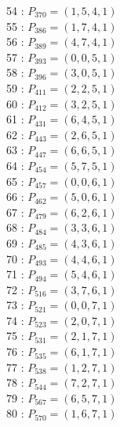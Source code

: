 \documentclass{article}
\begin{document}
{\begin{multicols}{3}
54 : $P_{370}=( 1, 5, 4, 1 )$\\
55 : $P_{386}=( 1, 7, 4, 1 )$\\
56 : $P_{389}=( 4, 7, 4, 1 )$\\
57 : $P_{393}=( 0, 0, 5, 1 )$\\
58 : $P_{396}=( 3, 0, 5, 1 )$\\
59 : $P_{411}=( 2, 2, 5, 1 )$\\
60 : $P_{412}=( 3, 2, 5, 1 )$\\
61 : $P_{431}=( 6, 4, 5, 1 )$\\
62 : $P_{443}=( 2, 6, 5, 1 )$\\
63 : $P_{447}=( 6, 6, 5, 1 )$\\
64 : $P_{454}=( 5, 7, 5, 1 )$\\
65 : $P_{457}=( 0, 0, 6, 1 )$\\
66 : $P_{462}=( 5, 0, 6, 1 )$\\
67 : $P_{479}=( 6, 2, 6, 1 )$\\
68 : $P_{484}=( 3, 3, 6, 1 )$\\
69 : $P_{485}=( 4, 3, 6, 1 )$\\
70 : $P_{493}=( 4, 4, 6, 1 )$\\
71 : $P_{494}=( 5, 4, 6, 1 )$\\
72 : $P_{516}=( 3, 7, 6, 1 )$\\
73 : $P_{521}=( 0, 0, 7, 1 )$\\
74 : $P_{523}=( 2, 0, 7, 1 )$\\
75 : $P_{531}=( 2, 1, 7, 1 )$\\
76 : $P_{535}=( 6, 1, 7, 1 )$\\
77 : $P_{538}=( 1, 2, 7, 1 )$\\
78 : $P_{544}=( 7, 2, 7, 1 )$\\
79 : $P_{567}=( 6, 5, 7, 1 )$\\
80 : $P_{570}=( 1, 6, 7, 1 )$\\
\end{multicols}


%


%


}%
\end{document}
